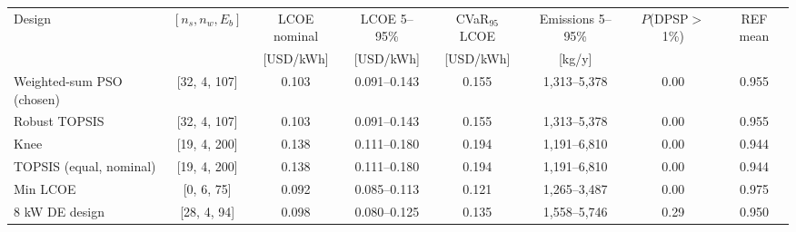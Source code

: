 \begin{tabular}{lccccccc}
\toprule
Design & $[n_s, n_w, E_b]$ & LCOE nominal & LCOE 5--95\% & CVaR$_{95}$ LCOE & Emissions 5--95\% & $P$(DPSP$>$1\%) & REF mean\\
 & & [USD/kWh] & [USD/kWh] & [USD/kWh] & [kg/y] & & \\
\midrule
Weighted-sum PSO (chosen) & [32, 4, 107] & 0.103 & 0.091--0.143 & 0.155 & 1,313--5,378 & 0.00 & 0.955\\
Robust TOPSIS & [32, 4, 107] & 0.103 & 0.091--0.143 & 0.155 & 1,313--5,378 & 0.00 & 0.955\\
Knee & [19, 4, 200] & 0.138 & 0.111--0.180 & 0.194 & 1,191--6,810 & 0.00 & 0.944\\
TOPSIS (equal, nominal) & [19, 4, 200] & 0.138 & 0.111--0.180 & 0.194 & 1,191--6,810 & 0.00 & 0.944\\
Min LCOE & [0, 6, 75] & 0.092 & 0.085--0.113 & 0.121 & 1,265--3,487 & 0.00 & 0.975\\
8 kW DE design & [28, 4, 94] & 0.098 & 0.080--0.125 & 0.135 & 1,558--5,746 & 0.29 & 0.950\\
\bottomrule
\end{tabular}
